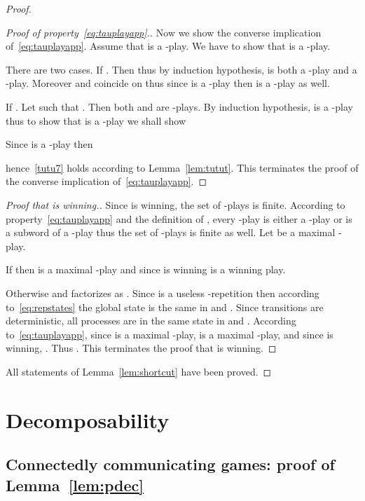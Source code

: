 \documentclass[a4paper,UKenglish]{lipics-v2016}
\begin{document}
\begin{proof}
\begin{proof}[Proof of property~\eqref{eq:tauplayapp}.]
\medskip

Now we show the converse implication of~\eqref{eq:tauplayapp}.
Assume that  is a -play.
We have to show that  is a -play.

There are two cases.
If .
Then  thus by induction hypothesis,
 is both a -play and a -play.
Moreover  and  coincide on  thus 
since  is a -play then  is a -play as well.

If . Let  such that .
Then both  and  are -plays.
By induction hypothesis,
 is a -play thus to show that  is a -play we shall show

Since  is a -play then

hence~\eqref{tutu7} holds according to Lemma~\ref{lem:tutut}.
This terminates the proof of the converse implication of~\eqref{eq:tauplayapp}.
\end{proof}

\begin{proof}[Proof that  is winning.]
Since  is winning, the set of -plays is finite.
According to property~\eqref{eq:tauplayapp} and the definition of ,
every -play is either a -play or is a subword of a -play thus the set of -plays is finite as well.
Let  be a maximal -play.

If  then  is a maximal -play and since
 is winning  is a winning play.

Otherwise  and  factorizes as .
Since  is a useless -repetition
then according to~\eqref{eq:repstates} the global state is the same in  and .
Since transitions are deterministic,
all processes are in the same state in  and .
According to~\eqref{eq:tauplayapp},
since  is a maximal -play,
 is a maximal -play,
and since  is winning,
.
Thus
.
This terminates the proof that   is winning.
\end{proof}


All statements of Lemma~\ref{lem:shortcut} have been proved.
\end{proof}


\section{Decomposability}

\subsection{Connectedly communicating games: proof of Lemma~\ref{lem:pdec}}
\end{document}
